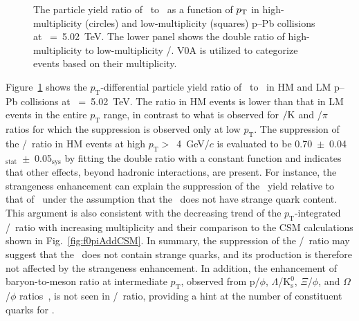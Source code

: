 \begin{figure}[!hbt]
	\centering
	\caption{The particle yield ratio of \fzero~to \kstar~as a function of $p_{\rm{T}}$ in high-multiplicity (circles) and low-multiplicity (squares) p--Pb collisions at \snn~=~5.02~TeV. The lower panel shows the double ratio of high-multiplicity to low-multiplicity \fzero/\kstar. V0A is utilized to categorize events based on their multiplicity. }
	\label{fig:f0KsPt}
\end{figure}

Figure~\ref{fig:f0KsPt} shows the $p_{\mathrm{T}}$-differential particle yield ratio of \fzero~to \kstar~in HM and LM p--Pb collisions at \snn~=~5.02~TeV. The ratio in HM events is lower than that in LM events in the entire $p_{\mathrm{T}}$ range, in contrast to what is observed for \kstar$\rm{}/K$ and \fzero/$\pi$ ratios for which the suppression is observed only at low $p_{\mathrm{T}}$. The suppression of the \fzero/\kstar~ratio in HM events at high $p_{\mathrm{T}}>$~4~GeV/$c$ is evaluated to be 0.70~$\pm$~0.04$_{\mathrm{stat}}$~$\pm$~0.05$_{\mathrm{sys}}$ by fitting the double ratio with a constant function and indicates that other effects, beyond hadronic interactions, are present. For instance, the strangeness enhancement can explain the suppression of the \fzero~yield relative to that of \kstar~under the assumption that the \fzero~does not have strange quark content. This argument is also consistent with the decreasing trend of the $p_{\mathrm{T}}$-integrated \fzero/\kstar~ratio with increasing multiplicity and their comparison to the CSM calculations shown in Fig.~\ref{fig:f0piAddCSM}. In summary, the suppression of the \fzero/\kstar~ratio may suggest that the \fzero~does not contain strange quarks, and its production is therefore not affected by the strangeness enhancement. In addition, the enhancement of baryon-to-meson ratio at intermediate $p_{\mathrm{T}}$, observed from p/$\phi$, $\Lambda$/$\mathrm{K}_{\mathrm{s}}^{0}$, $\Xi$/$\phi$, and $\Omega$/$\phi$ ratios~\cite{ALICE:2020jsh}, is not seen in \fzero/\kstar~ratio, providing a hint at the number of constituent quarks for \fzero.

